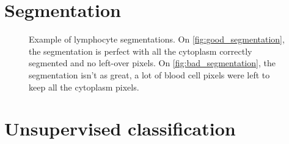 \documentclass{midl}
\begin{document}
\label{sec:conclusion}

\newpage


\appendix

\newpage
\section{Segmentation}

\begin{figure}[H]
    \centering
    {
         \qquad
    }
    {\caption{Example of lymphocyte segmentations. On \ref{fig:good_segmentation}, the segmentation is perfect with all the cytoplasm correctly segmented and no left-over pixels. On \ref{fig:bad_segmentation}, the segmentation isn't as great, a lot of blood cell pixels were left to keep all the cytoplasm pixels.\label{fig:segmentation}}}
\end{figure}

\section{Unsupervised classification}
\end{document}

